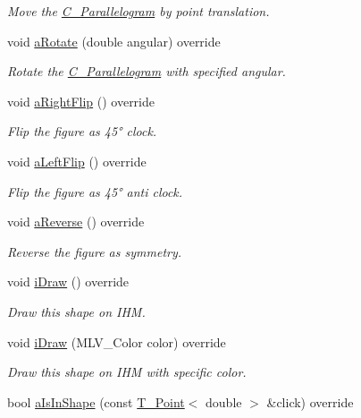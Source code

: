 \begin{DoxyCompactItemize}
\begin{DoxyCompactList}\small\item\em Move the \hyperlink{classC__Parallelogram}{C\+\_\+\+Parallelogram} by point translation. \end{DoxyCompactList}\item 
void \hyperlink{classC__Parallelogram_a07b6dfae7100a409cdcf04d710ac9c3f}{a\+Rotate} (double angular) override
\begin{DoxyCompactList}\small\item\em Rotate the \hyperlink{classC__Parallelogram}{C\+\_\+\+Parallelogram} with specified angular. \end{DoxyCompactList}\item 
void \hyperlink{classC__Parallelogram_ab638d55c999ea10da7b5000fd034fbc1}{a\+Right\+Flip} () override
\begin{DoxyCompactList}\small\item\em Flip the figure as 45° clock. \end{DoxyCompactList}\item 
void \hyperlink{classC__Parallelogram_a284a59c9f1c778ac8da80efedc313354}{a\+Left\+Flip} () override
\begin{DoxyCompactList}\small\item\em Flip the figure as 45° anti clock. \end{DoxyCompactList}\item 
void \hyperlink{classC__Parallelogram_a573447294989d53fadf3d7adfb0640c6}{a\+Reverse} () override
\begin{DoxyCompactList}\small\item\em Reverse the figure as symmetry. \end{DoxyCompactList}\item 
void \hyperlink{classC__Parallelogram_a6d43cc787a39def68c7b7de4a33caf5e}{i\+Draw} () override
\begin{DoxyCompactList}\small\item\em Draw this shape on I\+HM. \end{DoxyCompactList}\item 
void \hyperlink{classC__Parallelogram_a044ce6d1042ea93589a38f4686489862}{i\+Draw} (M\+L\+V\+\_\+\+Color color) override
\begin{DoxyCompactList}\small\item\em Draw this shape on I\+HM with specific color. \end{DoxyCompactList}\item 
bool \hyperlink{classC__Parallelogram_a9ccee396c30606bfe64df416c22586d5}{a\+Is\+In\+Shape} (const \hyperlink{classT__Point}{T\+\_\+\+Point}$<$ double $>$ \&click) override

\end{DoxyCompactItemize}
